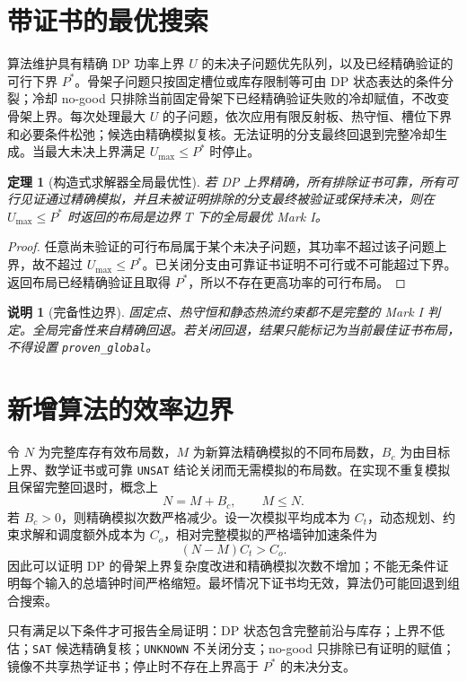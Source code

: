 \documentclass[UTF8,11pt]{ctexart}
\newtheorem{theorem}[definition]{定理}
\newtheorem{remark}[definition]{说明}
\begin{document}
\section{带证书的最优搜索}

算法维护具有精确 DP 功率上界 $U$ 的未决子问题优先队列，以及已经精确验证的可行下界 $P^*$。骨架子问题只按固定槽位或库存限制等可由 DP 状态表达的条件分裂；冷却 no-good 只排除当前固定骨架下已经精确验证失败的冷却赋值，不改变骨架上界。每次处理最大 $U$ 的子问题，依次应用有限反射板、热守恒、槽位下界和必要条件松弛；候选由精确模拟复核。无法证明的分支最终回退到完整冷却生成。当最大未决上界满足 $U_{\max}\le P^*$ 时停止。

\begin{theorem}[构造式求解器全局最优性]
若 DP 上界精确，所有排除证书可靠，所有可行见证通过精确模拟，并且未被证明排除的分支最终被验证或保持未决，则在 $U_{\max}\le P^*$ 时返回的布局是边界 $T$ 下的全局最优 Mark I。
\end{theorem}

\begin{proof}
任意尚未验证的可行布局属于某个未决子问题，其功率不超过该子问题上界，故不超过 $U_{\max}\le P^*$。已关闭分支由可靠证书证明不可行或不可能超过下界。返回布局已经精确验证且取得 $P^*$，所以不存在更高功率的可行布局。
\end{proof}

\begin{remark}[完备性边界]
固定点、热守恒和静态热流约束都不是完整的 Mark I 判定。全局完备性来自精确回退。若关闭回退，结果只能标记为当前最佳证书布局，不得设置 \texttt{proven\_global}。
\end{remark}

\section{新增算法的效率边界}

令 $N$ 为完整库存有效布局数，$M$ 为新算法精确模拟的不同布局数，$B_c$ 为由目标上界、数学证书或可靠 \texttt{UNSAT} 结论关闭而无需模拟的布局数。在实现不重复模拟且保留完整回退时，概念上
\[
N=M+B_c,
\qquad M\le N.
\]
若 $B_c>0$，则精确模拟次数严格减少。设一次模拟平均成本为 $C_t$，动态规划、约束求解和调度额外成本为 $C_o$，相对完整模拟的严格墙钟加速条件为
\[
(N-M)C_t>C_o.
\]
因此可以证明 DP 的骨架上界复杂度改进和精确模拟次数不增加；不能无条件证明每个输入的总墙钟时间严格缩短。最坏情况下证书均无效，算法仍可能回退到组合搜索。

只有满足以下条件才可报告全局证明：DP 状态包含完整前沿与库存；上界不低估；\texttt{SAT} 候选精确复核；\texttt{UNKNOWN} 不关闭分支；no-good 只排除已有证明的赋值；镜像不共享热学证书；停止时不存在上界高于 $P^*$ 的未决分支。
\end{document}
